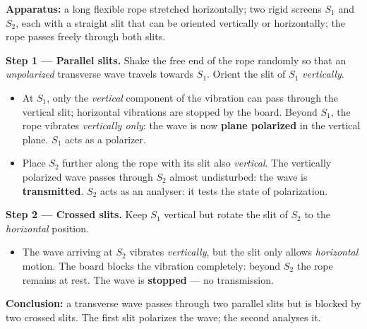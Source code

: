 \documentclass[11pt]{article}
\newcommand{\cle}[1]{{\popxbold\color{popdark}#1}}
\begin{document}
\begin{experience}
\textbf{Apparatus:} a long flexible rope stretched horizontally; two rigid screens $S_1$ and $S_2$, each with a straight slit that can be oriented vertically or horizontally; the rope passes freely through both slits.

\textbf{Step 1 --- Parallel slits.} Shake the free end of the rope randomly so that an \emph{unpolarized} transverse wave travels towards $S_1$. Orient the slit of $S_1$ \emph{vertically}.
\begin{itemize}
\item At $S_1$, only the \emph{vertical} component of the vibration can pass through the vertical slit; horizontal vibrations are stopped by the board. Beyond $S_1$, the rope vibrates \emph{vertically only}: the wave is now \textbf{plane polarized} in the vertical plane. $S_1$ acts as a \cle{polarizer}.
\item Place $S_2$ further along the rope with its slit also \emph{vertical}. The vertically polarized wave passes through $S_2$ almost undisturbed: the wave is \textbf{transmitted}. $S_2$ acts as an \cle{analyser}: it tests the state of polarization.
\end{itemize}

\textbf{Step 2 --- Crossed slits.} Keep $S_1$ vertical but rotate the slit of $S_2$ to the \emph{horizontal} position.
\begin{itemize}
\item The wave arriving at $S_2$ vibrates \emph{vertically}, but the slit only allows \emph{horizontal} motion. The board blocks the vibration completely: beyond $S_2$ the rope remains at rest. The wave is \textbf{stopped} --- no transmission.
\end{itemize}

\textbf{Conclusion:} a transverse wave passes through two parallel slits but is blocked by two crossed slits. The first slit polarizes the wave; the second analyses it.
\end{experience}
\end{document}

